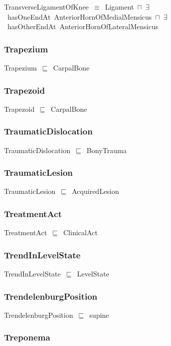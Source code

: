 \documentclass{article}
\begin{document}
TransverseLigamentOfKnee~\ensuremath{\equiv}~Ligament~\ensuremath{\sqcap}~\ensuremath{\exists}~hasOneEndAt~AnteriorHornOfMedialMensicus~\ensuremath{\sqcap}~\ensuremath{\exists}~hasOtherEndAt~AnteriorHornOfLateralMensicus

\subsubsection*{Trapezium}

Trapezium~\ensuremath{\sqsubseteq}~CarpalBone~

\subsubsection*{Trapezoid}

Trapezoid~\ensuremath{\sqsubseteq}~CarpalBone~

\subsubsection*{TraumaticDislocation}

TraumaticDislocation~\ensuremath{\sqsubseteq}~BonyTrauma~

\subsubsection*{TraumaticLesion}

TraumaticLesion~\ensuremath{\sqsubseteq}~AcquiredLesion~

\subsubsection*{TreatmentAct}

TreatmentAct~\ensuremath{\sqsubseteq}~ClinicalAct~

\subsubsection*{TrendInLevelState}

TrendInLevelState~\ensuremath{\sqsubseteq}~LevelState~

\subsubsection*{TrendelenburgPosition}

TrendelenburgPosition~\ensuremath{\sqsubseteq}~supine~

\subsubsection*{Treponema}
\end{document}
